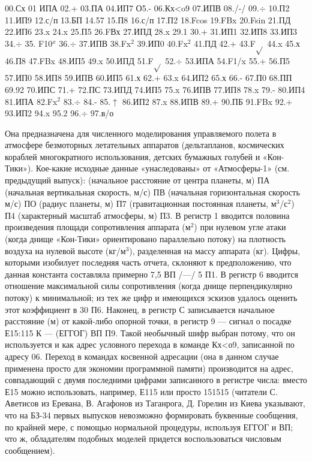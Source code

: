 \documentclass[11pt,a4paper,oneside]{article}
\begin{document}
00.Сх 01 ИПА 02.+ 03.ПА 04.ИП7 О5.- 06.Кх<o9
07.ИПВ 08./-/ 09.$\div$ 10.П2 11.ИП9 12.с/п 13.БП
14.57 15.П8 16.с/п 17.П2 18.Fcos 19.FBx
20.Fsin 21.ПД 22.ИП6 23.x 24.x 25.П5
26.FВх 27.ИПД 28.x 29.1 30.+ 31.ИП1 32.ИП8
33.ИП3 34.$\div$ 35. F10$^{x}$ 36.$\div$ 37.ИПВ 38.Fx$^{2}$
39.ИП0 40.Fx$^{2}$ 41.ПД 42.+ 43.F$\sqrt{}$ 44.x 45.х
46.П8 47.FBx 48.ИП5 49.x 50.ИПД 51.F$\sqrt{}$
52.$\div$ 53.ИПА 54.F1/x 55.+ 56.П5 57.ИП0
58.ИП8 59.ИПВ 60.ИП5 61.х 62.+ 63.x
64.ИП2 65.х 66.- 67.П0 68.ПП 69.92
70.ИПС 71.+ 72.ПС 73.ИПД 74.ИП5 75.x
76.ИПВ 77.ИП8 78.x 79.- 80.ИП4 81.ИПА
82.Fx$^{2}$ 83.$\div$ 84.- 85.$\uparrow$ 86.ИП2 87.x 88.ИПВ
89.+ 90.ПБ 91.FBx 92.+ 93.ИП2 94.x
95.2 96.$\div$ 97.в/о

Она предназначена для численного моделирования управляемого полета в атмосфере безмоторных летательных аппаратов (дельтапланов, космических кораблей многократного использования, детских бумажных голубей и «Кон-Тики»). Кое-какие исходные данные «унаследованы» от «Атмосферы-1» (см. предыдущий выпуск): (начальное расстояние от центра планеты, м) ПА (начальная вертикальная скорость, м/с) ПВ (начальная горизонтальная скорость м/с) ПО (радиус планеты, м) П7 (гравитационная постоянная планеты, м$^{3}$/с$^{2}$) П4 (характерный масштаб атмосферы, м) П3. В регистр 1 вводится половина произведения площади сопротивления аппарата (м$^{2}$) при нулевом угле атаки (когда днище «Кон-Тики» ориентировано параллельно потоку) на плотность воздуха на нулевой высоте (кг/м$^{3}$), разделенная на массу аппарата (кг). Цифры, которыми изобилует последняя часть отчета, склоняют к предположению, что данная константа составляла примерно 7,5 ВП /—/ 5 П1. В регистр 6 вводится отношение максимальной силы сопротивления (когда днище перпендикулярно потоку) к минимальной; из тех же цифр и имеющихся эскизов удалось оценить этот коэффициент в 30 П6. Наконец, в регистр С записывается начальное расстояние (м) от какой-либо опорной точки, в регистр 9 — сигнал о посадке Е15:115 К — (ЕГГОГ) ВП П9. Такой необычный шифр выбран потому, что он используется и как адрес условного перехода в команде Кх<о9, записанной по адресу 06. Переход в командах косвенной адресации (она в данном случае применена просто для экономии программной памяти) производится на адрес, совпадающий с двумя последними цифрами записанного в регистре числа: вместо Е15 можно использовать, например, Е115 или просто 151515 (читатели С. Аветисов из Еревана, В. Агафонов из Таганрога, Д. Горелин из Киева указывают, что на БЗ-34 первых выпусков невозможно формировать буквенные сообщения, по крайней мере, с помощью нормальной процедуры, используя ЕГГОГ и ВП; что ж, обладателям подобных моделей придется воспользоваться числовым сообщением).
\end{document}
